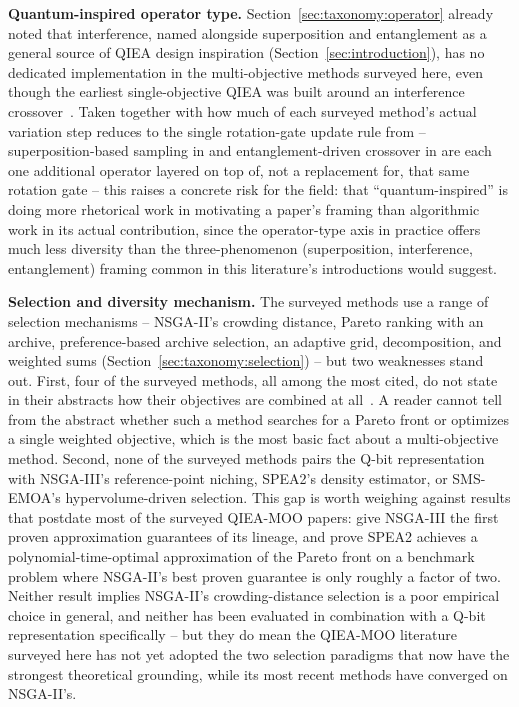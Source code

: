 \textbf{Quantum-inspired operator type.} Section~\ref{sec:taxonomy:operator}
already noted that interference, named alongside superposition and
entanglement as a general source of QIEA design inspiration
(Section~\ref{sec:introduction}), has no dedicated implementation in the
multi-objective methods surveyed here, even though the earliest
single-objective QIEA was built around an interference
crossover~\citep{narayanan1996qiga}. Taken together with how much of each surveyed
method's actual variation step reduces to the single rotation-gate
update rule from \citet{han2002qea} -- superposition-based sampling in
\citet{guzel2022qnsga2} and entanglement-driven crossover in
\citet{kumar2026eahqnsga2} are each one additional operator layered on
top of, not a replacement for, that same rotation gate -- this raises a
concrete risk for the field: that ``quantum-inspired'' is doing more
rhetorical work in motivating a paper's framing than algorithmic work in
its actual contribution, since the operator-type axis in practice offers
much less diversity than the three-phenomenon (superposition,
interference, entanglement) framing common in this literature's
introductions would suggest.

\textbf{Selection and diversity mechanism.} The surveyed
methods use a range of selection mechanisms -- NSGA-II's crowding
distance, Pareto ranking with an archive, preference-based archive
selection, an adaptive grid, decomposition, and weighted sums
(Section~\ref{sec:taxonomy:selection}) -- but two weaknesses stand out.
First, four of the surveyed methods, all among the most cited, do not state in
their abstracts how their objectives are combined at
all~\citep{wang2014powertrain,mousavi2019uav,deng2020gate,hussain2022moqiga}.
A reader cannot tell from the abstract whether such a method searches
for a Pareto front or optimizes a single weighted objective, which is
the most basic fact about a multi-objective method. Second, none of the
surveyed methods pairs the Q-bit representation with NSGA-III's
reference-point niching, SPEA2's density estimator, or SMS-EMOA's
hypervolume-driven selection. This gap is worth weighing
against results that postdate most of the surveyed
QIEA-MOO papers: \citet{deng2025nsga3guarantees} give NSGA-III the first
proven approximation guarantees of its lineage, and
\citet{alghouass2025spea2beatsnsga2} prove SPEA2 achieves a
polynomial-time-optimal approximation of the Pareto front on a
benchmark problem where NSGA-II's best proven guarantee is only
roughly a factor of two. Neither result implies NSGA-II's
crowding-distance selection is a poor empirical choice in general, and
neither has been evaluated in combination with a Q-bit representation
specifically -- but they do mean the QIEA-MOO literature surveyed here
has not yet adopted the two selection paradigms that now have the
strongest theoretical grounding, while its most recent methods have converged on
NSGA-II's.

